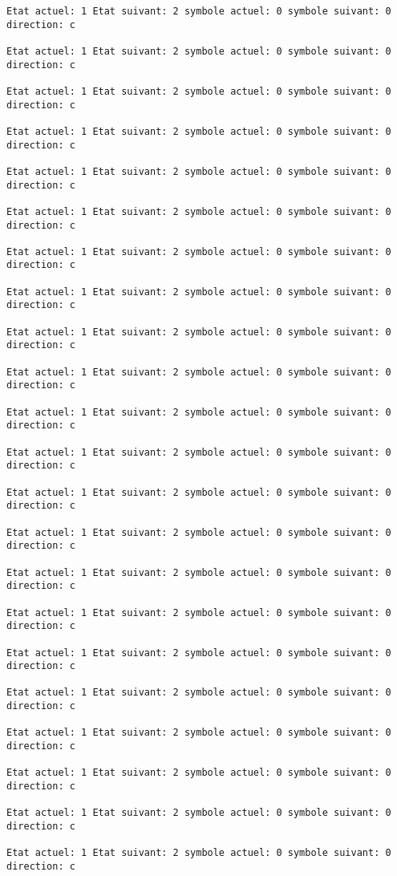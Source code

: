 \documentclass{article}
\begin{document}
\begin{verbatim}
Etat actuel: 1 Etat suivant: 2 symbole actuel: 0 symbole suivant: 0 direction: c

Etat actuel: 1 Etat suivant: 2 symbole actuel: 0 symbole suivant: 0 direction: c

Etat actuel: 1 Etat suivant: 2 symbole actuel: 0 symbole suivant: 0 direction: c

Etat actuel: 1 Etat suivant: 2 symbole actuel: 0 symbole suivant: 0 direction: c

Etat actuel: 1 Etat suivant: 2 symbole actuel: 0 symbole suivant: 0 direction: c

Etat actuel: 1 Etat suivant: 2 symbole actuel: 0 symbole suivant: 0 direction: c

Etat actuel: 1 Etat suivant: 2 symbole actuel: 0 symbole suivant: 0 direction: c

Etat actuel: 1 Etat suivant: 2 symbole actuel: 0 symbole suivant: 0 direction: c

Etat actuel: 1 Etat suivant: 2 symbole actuel: 0 symbole suivant: 0 direction: c

Etat actuel: 1 Etat suivant: 2 symbole actuel: 0 symbole suivant: 0 direction: c

Etat actuel: 1 Etat suivant: 2 symbole actuel: 0 symbole suivant: 0 direction: c

Etat actuel: 1 Etat suivant: 2 symbole actuel: 0 symbole suivant: 0 direction: c

Etat actuel: 1 Etat suivant: 2 symbole actuel: 0 symbole suivant: 0 direction: c

Etat actuel: 1 Etat suivant: 2 symbole actuel: 0 symbole suivant: 0 direction: c

Etat actuel: 1 Etat suivant: 2 symbole actuel: 0 symbole suivant: 0 direction: c

Etat actuel: 1 Etat suivant: 2 symbole actuel: 0 symbole suivant: 0 direction: c

Etat actuel: 1 Etat suivant: 2 symbole actuel: 0 symbole suivant: 0 direction: c

Etat actuel: 1 Etat suivant: 2 symbole actuel: 0 symbole suivant: 0 direction: c

Etat actuel: 1 Etat suivant: 2 symbole actuel: 0 symbole suivant: 0 direction: c

Etat actuel: 1 Etat suivant: 2 symbole actuel: 0 symbole suivant: 0 direction: c

Etat actuel: 1 Etat suivant: 2 symbole actuel: 0 symbole suivant: 0 direction: c

Etat actuel: 1 Etat suivant: 2 symbole actuel: 0 symbole suivant: 0 direction: c


\end{verbatim}
\end{document}
